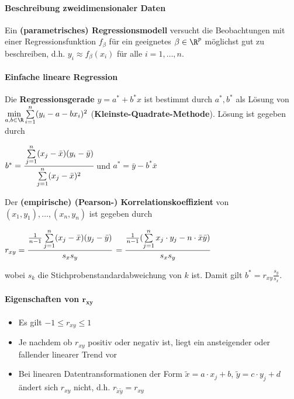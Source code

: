 \paragraph{Beschreibung zweidimensionaler Daten}
Ein \textbf{(parametrisches) Regressionsmodell} versucht die Beobachtungen mit einer Regressionsfunktion $f_\beta$ für ein geeignetes $\beta\in\R^p$ möglichst gut zu beschreiben, d.h. $y_i\approx f_\beta(x_i)$ für alle $i=1,\ldots,n$.

\paragraph{Einfache lineare Regression}
Die \textbf{Regressionsgerade} $y=a^*+b^*x$ ist bestimmt durch $a^*,b^*$ als Lösung von\\
$\min\limits_{a,b\in\R}\sum\limits_{i=1}^{n}(y_i-a-bx_i)^2$ (\textbf{Kleinste-Quadrate-Methode}).
Lösung ist gegeben durch
\begin{tightcenter}
	$b^*=\cfrac{\sum\limits_{j=1}^{n}(x_j-\bar{x})(y_i-\bar{y})}{\sum\limits_{j=1}^{n}(x_j-\bar{x})^2}$ \qquad und\qquad
	$a^*=\bar{y}-b^*\bar{x}$
\end{tightcenter}
Der \textbf{(empirische) (Pearson-) Korrelationskoeffizient} von $(x_1,y_1),\ldots,(x_n,y_n)$ ist gegeben durch
\begin{tightcenter}
	$r_{xy}=\cfrac{\frac{1}{n-1}\sum\limits_{j=1}^{n}(x_j-\bar{x})(y_j-\bar{y})}{s_xs_y}$
	$=\cfrac{\frac{1}{n-1}(\sum\limits_{j=1}^{n}x_j\cdot y_j-n\cdot\bar{x}\bar{y})}{s_xs_y}$
\end{tightcenter}
wobei $s_k$ die Stichprobenstandardabweichung von $k$ ist.
Damit gilt $b^*=r_{xy}\frac{s_y}{s_x}$.

\paragraph{Eigenschaften von $\boldsymbol{r_{xy}}$}
\begin{itemize}
	\item Es gilt $-1\leq r_{xy}\leq 1$
	\item Je nachdem ob $r_{xy}$ positiv oder negativ ist, liegt ein ansteigender oder fallender linearer Trend vor
	\item Bei linearen Datentransformationen der Form $\tilde{x}=a\cdot x_j+b$, $\tilde{y}=c\cdot y_j+d$ ändert sich $r_{xy}$ nicht, d.h. $r_{\tilde{x}\tilde{y}}=r_{xy}$
\end{itemize}
